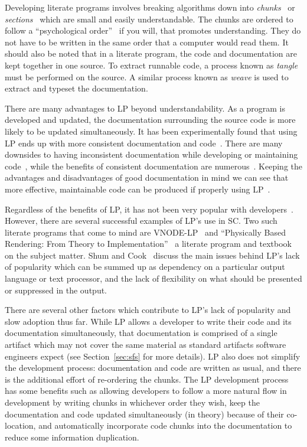 Developing literate programs involves breaking algorithms down into
\emph{chunks}~\cite{JohnsonAndJohnson1997} or \emph{sections}~\cite{Knuth1984}
which are small and easily understandable. The chunks are ordered to follow a 
``psychological order''~\cite{PieterseKourieAndBoake2004} if
you will, that promotes understanding. They do not have to be written in the 
same order that a computer would read them. It should also be noted that in a 
literate program, the code and documentation are kept together in one source. 
To extract runnable code, a process known as \emph{tangle} must be performed on 
the source. A similar process known as \emph{weave} is used to extract and 
typeset the documentation.

There are many advantages to LP beyond understandability. As a program is
developed and updated, the documentation surrounding the source code is more 
likely to be updated simultaneously. It has been experimentally found that 
using LP ends up with more consistent documentation and 
code~\cite{ShumAndCook1993}. There are many downsides to having inconsistent 
documentation while developing or maintaining 
code~\cite{Kotula2000,Thimbleby1986}, while the benefits of consistent 
documentation are numerous~\cite{Hyman1990, Kotula2000}. Keeping the advantages 
and disadvantages of good documentation in mind we can see that more effective, 
maintainable code can be produced if properly using 
LP~\cite{PieterseKourieAndBoake2004}.

Regardless of the benefits of LP, it has not been very popular with 
developers~\cite{ShumAndCook1993}. However, there are
several successful examples of LP's use in SC. Two such literate programs that 
come to mind are VNODE-LP~\cite{Nedialkov2006} and ``Physically Based 
Rendering: From Theory to Implementation''~\cite{PharrAndHumphreys2004} a 
literate program and textbook on the subject matter. Shum and 
Cook~\cite{ShumAndCook1993} discuss the main issues behind LP's lack of 
popularity which can be summed up as dependency on a 
particular output language or text processor, and the lack of flexibility on 
what should be presented or suppressed in the output.

There are several other factors which contribute to LP's lack of popularity and 
slow adoption thus far. While LP allows a developer to write their code and its 
documentation simultaneously, that documentation is comprised of a single 
artifact which may not cover the same material as standard artifacts software 
engineers expect (see Section~\ref{sec:sfs} for more details). LP also does not 
simplify the development process: documentation and code are written as usual, 
and there is the additional effort of re-ordering the chunks. The LP 
development process has some benefits such as allowing developers to follow a 
more natural flow in development by writing chunks in whichever order they 
wish, keep the documentation and code updated simultaneously (in theory) 
because of their co-location, and automatically incorporate code chunks into 
the documentation to reduce some information duplication.

